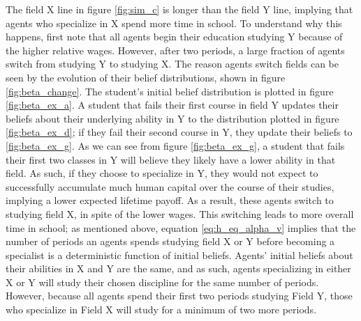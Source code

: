 The field X line in figure \ref{fig:sim_c} is longer than the field Y line, implying that agents who specialize in X spend more time in school.
To understand why this happens, first note that all agents begin their education studying Y because of the higher relative wages. 
However, after two periods, a large fraction of agents switch from studying Y to studying X. 
The reason agents switch fields can be seen by the evolution of their belief distributions, shown in figure \ref{fig:beta_change}.
The student's initial belief distribution is plotted in figure \ref{fig:beta_ex_a}.
A student that fails their first course in field Y updates their beliefs about their underlying ability in Y to the distribution plotted in figure \ref{fig:beta_ex_d}; if they fail their second course in Y, they update their beliefs to \ref{fig:beta_ex_g}.
As we can see from figure \ref{fig:beta_ex_g}, a student that fails their first two classes in Y will believe they likely have a lower ability in that field.
As such, if they choose to specialize in Y, they would not expect to successfully accumulate much human capital over the course of their studies, implying a lower expected lifetime payoff.
As a result, these agents switch to studying field X, in spite of the lower wages.
This switching leads to more overall time in school; as mentioned above, equation \eqref{eq:h_eq_alpha_v} implies that the number of periods an agents spends studying field X or Y before becoming a specialist is a deterministic function of initial beliefs. 
Agents' initial beliefs about their abilities in X and Y are the same, and as such, agents specializing in either X or Y will study their chosen discipline for the same number of periods. 
However, because all agents spend their first two periods studying Field Y, those who specialize in Field X will study for a minimum of two more periods.

